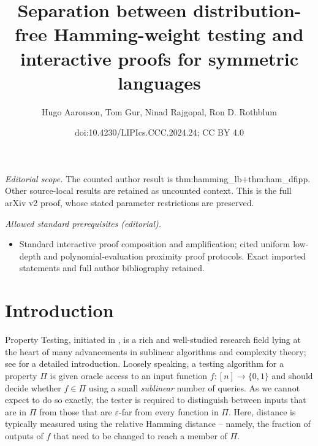 \documentclass[10pt,a4paper]{article}
\title{Separation between distribution-free Hamming-weight testing and interactive proofs for symmetric languages}
\author{Hugo Aaronson, Tom Gur, Ninad Rajgopal, Ron D. Rothblum}
\date{doi:10.4230/LIPIcs.CCC.2024.24; CC BY 4.0}
\begin{document}
\maketitle
\setcounter{section}{1}
\noindent\textit{Editorial scope.} The counted author result is thm:hamming\_lb+thm:ham\_dfipp. Other source-local results are retained as uncounted context. This is the full arXiv v2 proof, whose stated parameter restrictions are preserved.\par\medskip
\noindent\textit{Allowed standard prerequisites (editorial).}\begin{itemize}
\item Standard interactive proof composition and amplification; cited uniform low-depth and polynomial-evaluation proximity proof protocols. Exact imported statements and full author bibliography retained.
\end{itemize}\medskip
\section{Introduction}
Property Testing, initiated in \cite{RS96, GGR98}, is a rich and well-studied research field lying at the heart of many advancements in sublinear algorithms and complexity theory; see \cite{Gol17_book,BY22} for a detailed introduction. Loosely speaking, a testing algorithm for a property $\Pi$ is given oracle access to an input function $f:[n]\rightarrow\{0,1\}$ and should decide whether $f \in \Pi$ using a small \emph{sublinear} number of queries. As  we cannot expect to do so exactly, the tester is required to distinguish between inputs that are in $\Pi$ from those that are $\varepsilon$-far from every function in $\Pi$. Here, distance is typically measured using the relative Hamming distance -- namely, the fraction of outputs of $f$ that need to be changed to reach a member of $\Pi$.
\end{document}
